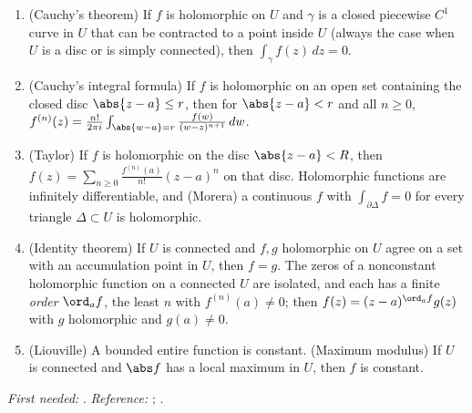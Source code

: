 \begin{theorem}\label{thm:prereq:cauchy}
\begin{enumerate}[label=(\alph*)]
\item (Cauchy's theorem) If $f$ is holomorphic on $U$ and $\gamma$ is a closed piecewise $C^1$
curve in $U$ that can be contracted to a point inside $U$ (always the case when $U$ is a disc or is
simply connected), then $\int_\gamma f(z)\,dz=0$.
\item (Cauchy's integral formula) If $f$ is holomorphic on an open set containing the closed disc
$\abs{z-a}\le r$, then for $\abs{z-a}<r$ and all $n\ge0$,
$f^{(n)}(z)=\frac{n!}{2\pi i}\int_{\abs{w-a}=r}\frac{f(w)}{(w-z)^{n+1}}\,dw$.
\item (Taylor) If $f$ is holomorphic on the disc $\abs{z-a}<R$, then
$f(z)=\sum_{n\ge0}\frac{f^{(n)}(a)}{n!}(z-a)^n$ on that disc. Holomorphic functions are infinitely
differentiable, and (Morera) a continuous $f$ with $\int_{\partial\Delta}f=0$ for every triangle
$\Delta\subset U$ is holomorphic.
\item (Identity theorem) If $U$ is connected and $f,g$ holomorphic on $U$ agree on a set with an
accumulation point in $U$, then $f=g$. The zeros of a nonconstant holomorphic function on a
connected $U$ are isolated, and each has a finite \emph{order} $\ord_af$, the least $n$ with
$f^{(n)}(a)\ne0$; then $f(z)=(z-a)^{\ord_af}g(z)$ with $g$ holomorphic and $g(a)\ne0$.
\item (Liouville) A bounded entire function is constant. (Maximum modulus) If $U$ is connected and
$\abs f$ has a local maximum in $U$, then $f$ is constant.
\end{enumerate}
\end{theorem}
\noindent\emph{First needed:} . \emph{Reference:} \cite[Chapter 4]{Ahlfors79};
\cite[Chapters 2 and 3]{SteinShakarchi03}.

